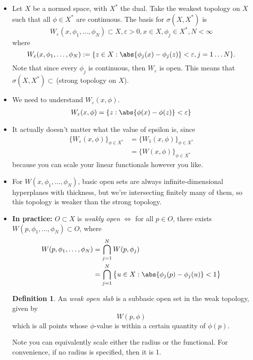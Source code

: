 \documentclass[a5paper]{article}
\theoremstyle{definition}%
\newtheorem*{definition*}{Definition}
\numberwithin{exercise}{section}
\theoremstyle{remark}%
\renewcommand{\epsilon}{\varepsilon}
\begin{document}
\begin{itemize}
\item Let $X$ be a normed space, with $X^*$ the dual. Take the weakest topology on $X$ such that all $\phi\in X^*$ are continuous. The basis for $\sigma (X, X^*)$ is 
$$W_\epsilon(x,\phi_1, \dots, \phi_N)\subset X, \epsilon>0, x\in X, \phi_j\in X^*, N<\infty$$
where 
$$W_\epsilon(x,\phi_1, \dots, \phi_N):= \{z\in X: \abs{\phi_j(x)-\phi_j(z)}<\epsilon, j=1\dots N\}.$$
Note that since every $\phi_j$ is continuous, then $W_\epsilon$ is open. This means that $\sigma (X,X^*)\subset\,$(strong topology on $X$).

\item We need to understand $W_\epsilon(x,\phi)$. 
\begin{align*}
W_\epsilon(x,\phi) & = \{z: \abs{\phi(x)-\phi(z)}<\epsilon\} \\
\end{align*}

\item It actually doesn't matter what the value of epsilon is, since 
\begin{align*}
\{W_\epsilon(x,\phi)\}_{\phi\in X^*} &= \{W_1(x,\phi)\}_{\phi\in X^*} \\
&= \{W(x,\phi)\}_{\phi\in X^*}
\end{align*}
because you can scale your linear functionals however you like. 

\item For $W(x, \phi_1, \dots, \phi_N)$, basic open sets are always infinite-dimensional hyperplanes with thickness, but we're intersecting finitely many of them, so this topology is weaker than the strong topology. 

\item \textbf{In practice:} $O\subset X$ is \emph{weakly open} $\iff $   for all $p\in O$, there exists $W(p,\phi_1, \dots, \phi_N)\subset O$, where 
\begin{align*}
W(p,\phi_1, \dots, \phi_N) &= \bigcap_{j=1}^N W(p,\phi_j)\\
&= \bigcap_{j=1}^N \big\lbrace u\in X: \abs{\phi_j(p)-\phi_j(u)}<1\big\rbrace
\end{align*}

\begin{highlight}
\begin{definition*}
An \emph{weak open slab} is a subbasic open set in the weak topology, given by 
$$W(p,\phi)$$
which is all points whose $\phi$-value is within a certain quantity of $\phi(p)$.
\end{definition*}
\end{highlight}
Note you can equivalently scale either the radius or the functional. For convenience, if no radius is specified, then it is 1. 


\end{itemize}
\end{document}
